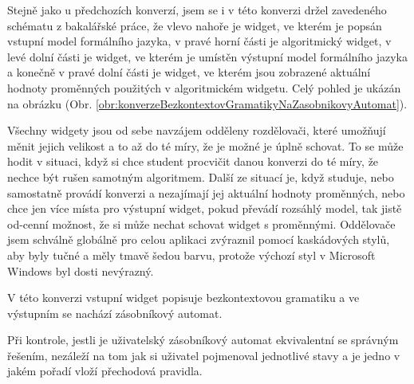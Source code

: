 
Stejně jako u předchozích konverzí, jsem se i v této konverzi držel zavedeného schématu z bakalářské práce, že vlevo nahoře je widget, ve kterém je popsán vstupní model formálního jazyka, v pravé horní části je algoritmický widget, v levé dolní části je widget, ve kterém je umístěn výstupní model formálního jazyka a konečně v pravé dolní části je widget, ve kterém jsou zobrazené aktuální hodnoty proměnných použitých v algoritmickém widgetu. Celý pohled je ukázán na obrázku (Obr. \ref{obr:konverzeBezkontextovGramatikyNaZasobnikovyAutomat}). 

Všechny widgety jsou od sebe navzájem odděleny rozdělovači, které umožňují měnit jejich velikost a to až do té míry, že je možné je úplně schovat. To se může hodit v situaci, když si chce student procvičit danou konverzi do té míry, že nechce být rušen samotným algoritmem. Další ze situací je, když studuje, nebo samostatně provádí konverzi a nezajímají jej aktuální hodnoty proměnných, nebo chce jen více místa pro výstupní widget, pokud převádí rozsáhlý model, tak jistě od-cenní možnost, že si může nechat schovat widget s proměnnými. Oddělovače jsem schválně globálně pro celou aplikaci zvýraznil pomocí kaskádových stylů, aby byly tučné a měly tmavě šedou barvu, protože výchozí styl v Microsoft Windows byl dosti nevýrazný.

V této konverzi vstupní widget popisuje bezkontextovou gramatiku a ve výstupním se nachází zásobníkový automat.

Při kontrole, jestli je uživatelský zásobníkový automat ekvivalentní se správným řešením, nezáleží na tom jak si uživatel pojmenoval jednotlivé stavy a je jedno v jakém pořadí vloží přechodová pravidla.




